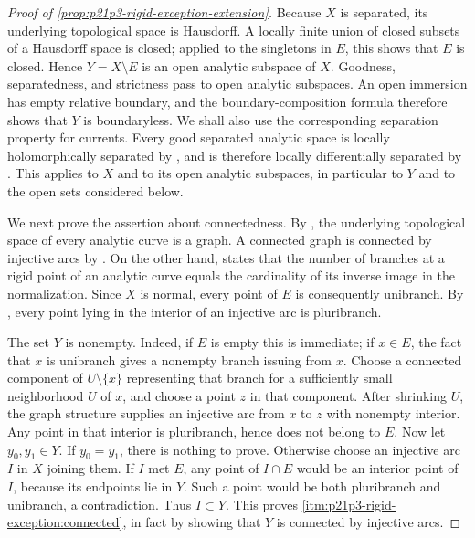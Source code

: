 
\begin{proof}[Proof of
\cref{prop:p21p3-rigid-exception-extension}]
Because $X$ is separated, its underlying topological space is Hausdorff.
A locally finite union of closed subsets of a Hausdorff space is closed;
applied to the singletons in $E$, this shows that $E$ is closed.  Hence
$Y=X\setminus E$ is an open analytic subspace of $X$.  Goodness,
separatedness, and strictness pass to open analytic subspaces.  An open
immersion has empty relative boundary, and the boundary-composition formula
\cite[(11.4.1.3)]{CLD25} therefore shows that $Y$ is boundaryless.
We shall also use the corresponding separation property for currents.
Every good separated analytic space is locally holomorphically separated by
\cite[\S15.2.2]{CLD25}, and is therefore locally differentially separated by
\cite[Corollary~15.2.4]{CLD25}.  This applies to $X$ and to its open analytic
subspaces, in particular to $Y$ and to the open sets considered below.

We next prove the assertion about connectedness.  By
\cite[Theorem~3.5.1]{Ducros24CurveStructure}, the underlying topological
space of every analytic curve is a graph.  A connected graph is connected by
injective arcs by \cite[\S1.3.5]{Ducros24CurveStructure}.  On the other hand,
\cite[Proposition~3.5.2]{Ducros24CurveStructure} states that the number of
branches at a rigid point of an analytic curve equals the cardinality of its
inverse image in the normalization.  Since $X$ is normal, every point of $E$
is consequently unibranch.  By
\cite[\S1.3.12]{Ducros24CurveStructure}, every point lying in the interior of
an injective arc is pluribranch.

The set $Y$ is nonempty.  Indeed, if $E$ is empty this is immediate; if
$x\in E$, the fact that $x$ is unibranch gives a nonempty branch issuing
from $x$.  Choose a connected component of $U\setminus\{x\}$ representing
that branch for a sufficiently small neighborhood $U$ of $x$, and choose a
point $z$ in that component.  After shrinking $U$, the graph structure
supplies an injective arc from $x$ to $z$ with nonempty interior.  Any point
in that interior is pluribranch, hence does not belong to $E$.  Now let
$y_0,y_1\in Y$.  If $y_0=y_1$, there is nothing to prove.
Otherwise choose an injective arc $I$ in $X$ joining them.  If $I$ met $E$,
any point of $I\cap E$ would be an interior point of $I$, because its
endpoints lie in $Y$.  Such a point would be both pluribranch and unibranch,
a contradiction.  Thus $I\subset Y$.
This proves \cref{itm:p21p3-rigid-exception:connected}, in fact by showing
that $Y$ is connected by injective arcs.


\end{proof}
